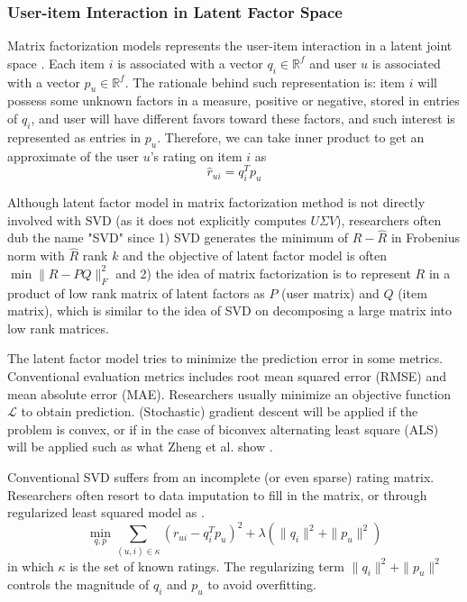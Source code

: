 \documentclass[letter paper, 11pt]{article}
\begin{document}
	\subsubsection{User-item Interaction in Latent Factor Space}
	Matrix factorization models represents the user-item interaction in a latent joint space \cite{MFinRS}. Each item $i$ is associated with a vector $q_i \in \mathbb{R}^f$ and user $u$ is associated with a vector $p_u \in \mathbb{R}^f$. The rationale behind such representation is: item $i$ will possess some unknown factors in a measure, positive or negative, stored in entries of $q_i$, and user will have different favors toward these factors, and such interest is represented as entries in $p_u$. Therefore, we can take inner product to get an approximate of the user $u$'s rating on item $i$ as \cite{MFinRS} 
	\begin{equation}
		\hat{r}_{ui} = q_i^T  p_u 
	\end{equation}
	
	
	Although latent factor model in matrix factorization method is not directly involved with SVD (as it does not explicitly computes $U \Sigma V$), researchers often dub the name "SVD" since 1) SVD generates the minimum of $R - \hat{R}$ in Frobenius norm with $\hat{R}$ rank $k$ and the objective of latent factor model is often $\min \|R - P Q\|_F^2$ and 2) the idea of matrix factorization is to represent $R$ in a product of low rank matrix of latent factors as $P$ (user matrix) and $Q$ (item matrix), which is similar to the idea of SVD on decomposing a large matrix into low rank matrices. 
	
	The latent factor model tries to minimize the prediction error in some metrics. Conventional evaluation metrics includes root mean squared error (RMSE) and mean absolute error (MAE). Researchers usually minimize an objective function $\mathcal{L}$ to obtain prediction. (Stochastic) gradient descent will be applied if the problem is convex, or if in the case of biconvex alternating least square (ALS) will be applied such as what Zheng et al. show \cite{RSVD}.
	
	
	Conventional SVD suffers from an incomplete (or even sparse) rating matrix. Researchers often resort to data imputation to fill in the matrix, or through regularized least squared model as \cite{MFinRS}.
	\begin{equation}
		\min_{q, p} \sum_{(u, i) \in \kappa} (r_{ui} - q_i^T p_u)^2 + \lambda(\|q_i\|^2 + \|p_u\|^2)
	\end{equation}
	in which $\kappa$ is the set of known ratings. The regularizing term $\|q_i\|^2 + \|p_u\|^2$ controls the magnitude of $q_i$ and $p_u$ to avoid overfitting.
	
\end{document}
